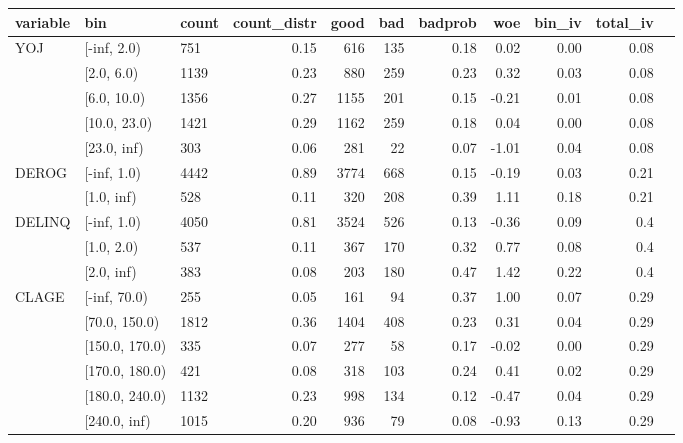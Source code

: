 \begin{landscape}
	\begin{figure}[!ht]
		\centering
		\begin{tabular}{lllrrrrrrrr}
			\toprule
			variable & bin &  count &  count\_distr &  good &  bad &   badprob &       woe &    bin\_iv &  total\_iv \\
			\midrule
			      YOJ &   [-inf, 2.0) &    751 &         0.15 &   616 &  135 &     0.18 &  0.02 &    0.00 &      0.08 \\
      &    [2.0, 6.0) &   1139 &         0.23 &   880 &  259 &     0.23 &  0.32 &    0.03 &      0.08 \\
      &   [6.0, 10.0) &   1356 &         0.27 &  1155 &  201 &     0.15 & -0.21 &    0.01 &      0.08 \\
      &  [10.0, 23.0) &   1421 &         0.29 &  1162 &  259 &     0.18 &  0.04 &    0.00 &      0.08 \\
      &   [23.0, inf) &    303 &         0.06 &   281 &   22 &     0.07 & -1.01 &    0.04 &      0.08 \\
			\midrule
			   DEROG &  [-inf, 1.0) &   4442 &         0.89 &  3774 &  668 &     0.15 & -0.19 &    0.03 &      0.21 \\
    &   [1.0, inf) &    528 &         0.11 &   320 &  208 &     0.39 &  1.11 &    0.18 &      0.21 \\
			\midrule
			  DELINQ &  [-inf, 1.0) &   4050 &         0.81 &  3524 &  526 &     0.13 & -0.36 &    0.09 &       0.4 \\
	   &   [1.0, 2.0) &    537 &         0.11 &   367 &  170 &     0.32 &  0.77 &    0.08 &       0.4 \\
	   &   [2.0, inf) &    383 &         0.08 &   203 &  180 &     0.47 &  1.42 &    0.22 &       0.4 \\
			\midrule
			   CLAGE &    [-inf, 70.0) &    255 &         0.05 &   161 &   94 &     0.37 &  1.00 &    0.07 &      0.29 \\
	    &   [70.0, 150.0) &   1812 &         0.36 &  1404 &  408 &     0.23 &  0.31 &    0.04 &      0.29 \\
	    &  [150.0, 170.0) &    335 &         0.07 &   277 &   58 &     0.17 & -0.02 &    0.00 &      0.29 \\
	    &  [170.0, 180.0) &    421 &         0.08 &   318 &  103 &     0.24 &  0.41 &    0.02 &      0.29 \\
	    &  [180.0, 240.0) &   1132 &         0.23 &   998 &  134 &     0.12 & -0.47 &    0.04 &      0.29 \\
	    &    [240.0, inf) &   1015 &         0.20 &   936 &   79 &     0.08 & -0.93 &    0.13 &      0.29 \\

\end{tabular}
\end{figure}
\end{landscape}
